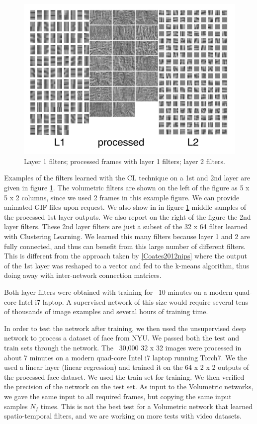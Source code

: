 \documentclass{article} %
\begin{document}
\begin{figure}
\centering
\includegraphics[width=5in]{fig-filtersproc.png}
\caption{Layer 1 filters; processed frames with layer 1 filters; layer 2 filters.}
\label{fig-filterproc}
\end{figure}


Examples of the filters learned with the CL technique on a 1st and 2nd layer are given in figure \ref{fig-filterproc}. The volumetric filters are shown on the left of the figure as 5 x 5 x 2 columns, since we used 2 frames in this example figure. We can provide animated-GIF files upon request. We also show in in figure \ref{fig-filterproc}-middle samples of the processed  1st layer outputs. We also report on the right of the figure the 2nd layer filters. These 2nd layer filters are just a subset of the 32 x 64 filter learned with Clustering Learning. We learned this many filters because layer 1 and 2 are fully connected, and thus can benefit from this large number of different filters. This is different from the approach taken by \ref{Coates2012nips} where the output of the 1st layer was reshaped to a vector and fed to the k-means algorithm, thus doing away with inter-network connection matrices. 

Both layer filters were obtained with training for ~10 minutes on a modern quad-core Intel i7 laptop. A supervised network of this size would require several tens of thousands of image examples and several hours of training time.

In order to test the network after training, we then used the unsupervised deep network to process a dataset of face from NYU. We passed both the test and train sets through the network. The ~30,000 32 x 32 images were processed in about 7 minutes on a modern quad-core Intel i7 laptop running Torch7. We the used a linear layer (linear regression) and trained it on the 64 x 2 x 2 outputs of the processed face dataset. We used the train set for training. We then verified the precision of the network on the test set.
As input to the Volumetric networks, we gave the same input to all required frames, but copying the same input samples $N_f$ times. This is not the best test for a Volumetric network that learned spatio-temporal filters, and we are working on more tests with video datasets.
\end{document}
